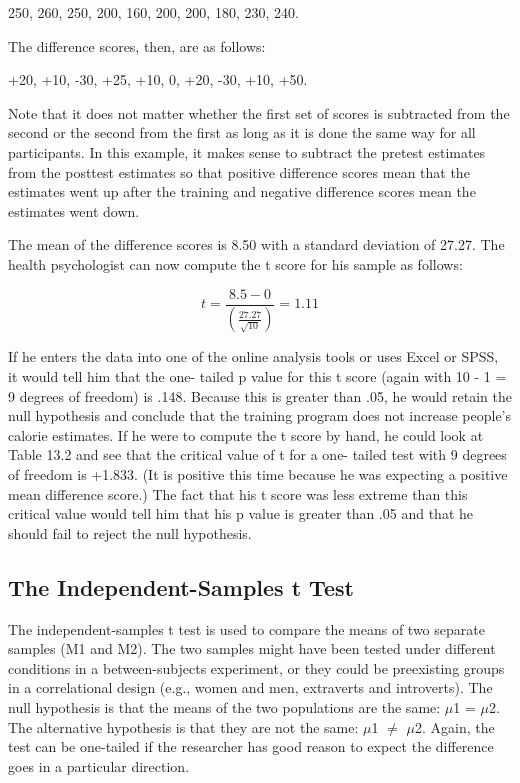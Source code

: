\begin{kframe}
250, 260, 250, 200, 160, 200, 200, 180, 230, 240.

\end{kframe}

The difference scores, then, are as follows:


\begin{kframe}
+20, +10, -30, +25, +10, 0, +20, -30, +10, +50.

\end{kframe}

Note that it does not matter whether the first set of scores is subtracted from the second or the second from the
first as long as it is done the same way for all participants. In this example, it makes sense to subtract the pretest estimates from the posttest estimates so that positive difference scores mean that the estimates went up after the training and negative difference scores mean the estimates went down.


The mean of the difference scores is 8.50 with a standard deviation of 27.27. The health psychologist can now compute the t score for his sample as follows:


\begin{equation}
t = \frac{8.5-0}{\left( \frac{27.27}{\sqrt{10}} \right) } = 1.11
\end{equation}

If he enters the data into one of the online analysis tools or uses Excel or SPSS, it would tell him that the one- tailed p value for this t score (again with 10 - 1 = 9 degrees of freedom) is .148. Because this is greater than .05, he would retain the null hypothesis and conclude that the training program does not increase people's calorie estimates. If he were to compute the t score by hand, he could look at Table 13.2 and see that the critical value of t for a one- tailed test with 9 degrees of freedom is +1.833. (It is positive this time because he was expecting a positive mean difference score.) The fact that his t score was less extreme than this critical value would tell him that his p value is greater than .05 and that he should fail to reject the null hypothesis.


\subsection{The Independent-Samples t Test}

The independent-samples t test is used to compare the means of two separate samples (M1 and M2). The two samples might have been tested under different conditions in a between-subjects experiment, or they could be preexisting groups in a correlational design (e.g., women and men, extraverts and introverts). The null hypothesis is that the means of the two populations are the same: $\mu$1 = $\mu$2. The alternative hypothesis is that they are not the same: $\mu$1 $\neq$  $\mu$2. Again, the test can be one-tailed if the researcher has good reason to expect the difference goes in a particular direction.



